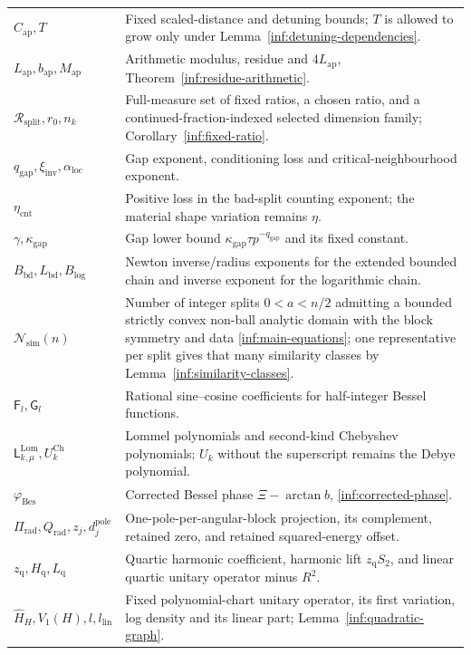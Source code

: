 \begin{longtable}{@{}>{\raggedright\arraybackslash}p{}>{\raggedright\arraybackslash}p{}@{}}
$C_{\mathrm{ap}},T$ & Fixed scaled-distance and detuning bounds; $T$ is allowed to grow only under Lemma~\ref{inf:detuning-dependencies}.\\
$L_{\mathrm{ap}},b_{\mathrm{ap}},M_{\mathrm{ap}}$ & Arithmetic modulus, residue and $4L_{\mathrm{ap}}$, Theorem~\ref{inf:residue-arithmetic}.\\
$\mathcal R_{\mathrm{split}},r_0,n_k$ & Full-measure set of fixed ratios, a chosen ratio, and a continued-fraction-indexed selected dimension family; Corollary~\ref{inf:fixed-ratio}.\\
$q_{\mathrm{gap}},\xi_{\mathrm{inv}},\alpha_{\mathrm{loc}}$ & Gap exponent, conditioning loss and critical-neighbourhood exponent.\\
$\eta_{\mathrm{cnt}}$ & Positive loss in the bad-split counting exponent; the material shape variation remains $\eta$.\\
$\gamma,\kappa_{\mathrm{gap}}$ & Gap lower bound $\kappa_{\mathrm{gap}}\tau p^{-q_{\mathrm{gap}}}$ and its fixed constant.\\
$B_{\mathrm{bd}},L_{\mathrm{bd}},B_{\log}$ & Newton inverse/radius exponents for the extended bounded chain and inverse exponent for the logarithmic chain.\\
$\mathcal N_{\mathrm{sim}}(n)$ & Number of integer splits $0<a<n/2$ admitting a bounded strictly convex non-ball analytic domain with the block symmetry and data \eqref{inf:main-equations}; one representative per split gives that many similarity classes by Lemma~\ref{inf:similarity-classes}.\\
$\mathsf F_l,\mathsf G_l$ & Rational sine--cosine coefficients for half-integer Bessel functions.\\
$\mathsf L^{\mathrm{Lom}}_{k,\mu},U_k^{\mathrm{Ch}}$ & Lommel polynomials and second-kind Chebyshev polynomials; $U_k$ without the superscript remains the Debye polynomial.\\
$\varphi_{\mathrm{Bes}}$ & Corrected Bessel phase $\Xi-\arctan b$, \eqref{inf:corrected-phase}.\\
$\Pi_{\mathrm{rad}},Q_{\mathrm{rad}},z_j,d_j^{\mathrm{pole}}$ & One-pole-per-angular-block projection, its complement, retained zero, and retained squared-energy offset.\\
$z_{\mathrm q},H_{\mathrm q},L_{\mathrm q}$ & Quartic harmonic coefficient, harmonic lift $z_{\mathrm q}S_2$, and linear quartic unitary operator minus $R^2$.\\
$\widehat H_H,V_1(H),l,l_{\mathrm{lin}}$ & Fixed polynomial-chart unitary operator, its first variation, log density and its linear part; Lemma~\ref{inf:quadratic-graph}.\\

\end{longtable}

